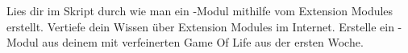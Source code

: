 \begin{aufg_schw}
  Lies dir im Skript durch wie man ein \Python-Modul mithilfe vom Extension Modules erstellt.
  Vertiefe dein Wissen über Extension Modules im Internet.
  Erstelle ein \Python-Modul aus deinem mit  verfeinerten Game Of Life aus der ersten Woche.
\end{aufg_schw}
